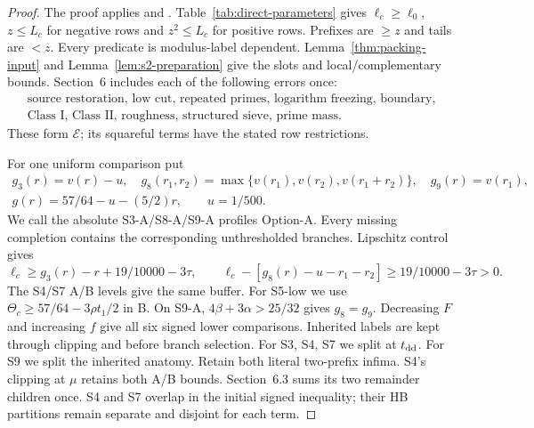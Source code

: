 \begin{proof}
The proof applies \cite[Theorem~4]{ref5} and \cite[Theorem~2.6, (2.30)--(2.33b)]{Z1}.
Table~\ref{tab:direct-parameters} gives $\ell_c\ge\ell_0$,
$z\le L_c$ for negative rows and $z^2\le L_c$ for positive rows.
Prefixes are $\ge z$ and tails are $<z$.
Every predicate is modulus-label dependent.
Lemma~\ref{thm:packing-input} and Lemma~\ref{lem:s2-preparation}
give the slots and local/complementary bounds.
Section~6 includes each of the following errors once:
\[
\begin{array}{c}
\text{source restoration, low cut, repeated primes, logarithm freezing, boundary,}\\
\text{Class I, Class II, roughness, structured sieve, prime mass}.
\end{array}
\]
These form $\mathcal E$; its squareful terms have the stated row restrictions.

For one uniform comparison put
\[
\begin{gathered}
 g_3(r)=v(r)-u,\quad
 g_8(r_1,r_2)=\max\{v(r_1),v(r_2),v(r_1+r_2)\},\quad g_9(r)=v(r_1),\\
 g(r)=57/64-u-(5/2)r,\qquad u=1/500.
\end{gathered}
\]
We call the absolute S3-A/S8-A/S9-A profiles Option-A.
Every missing completion contains the corresponding unthresholded branches.
Lipschitz control gives
\[
 \ell_c\ge g_3(r)-r+19/10000-3\tau,\qquad
 \ell_c-[g_8(r)-u-r_1-r_2]\ge19/10000-3\tau>0.
\]
The S4/S7 A/B levels give the same buffer.
For S5-low we use $\Theta_c\ge57/64-3\rho t_1/2$ in B.
On S9-A, $4\beta+3\alpha>25/32$ gives $g_8=g_9$.
Decreasing $F$ and increasing $f$ give all six signed lower comparisons.
Inherited labels are kept through clipping and before branch selection.
For S3, S4, S7 we split at $t_{\rm dd}$.
For S9 we split the inherited anatomy.
Retain both literal two-prefix infima.
S4's clipping at $\mu$ retains both A/B bounds.
Section~6.3 sums its two remainder children once.
S4 and S7 overlap in the initial signed inequality;
their HB partitions remain separate and disjoint for each term.


\end{proof}
